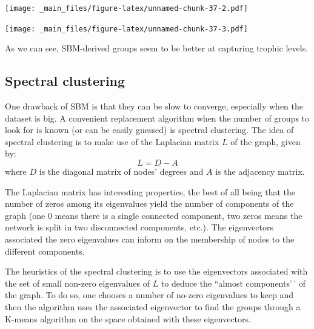 \documentclass[
]{book}
\newenvironment{Shaded}{\begin{snugshade}}{\end{snugshade}}
\newcommand{\AttributeTok}[1]{\textcolor[rgb]{0.13,0.29,0.53}{#1}}
\newcommand{\DecValTok}[1]{\textcolor[rgb]{0.00,0.00,0.81}{#1}}
\newcommand{\FloatTok}[1]{\textcolor[rgb]{0.00,0.00,0.81}{#1}}
\newcommand{\FunctionTok}[1]{\textcolor[rgb]{0.13,0.29,0.53}{\textbf{#1}}}
\newcommand{\NormalTok}[1]{#1}
\newcommand{\SpecialCharTok}[1]{\textcolor[rgb]{0.81,0.36,0.00}{\textbf{#1}}}
\newcommand{\StringTok}[1]{\textcolor[rgb]{0.31,0.60,0.02}{#1}}
\theoremstyle{definition}
\theoremstyle{definition}
\theoremstyle{definition}
\theoremstyle{definition}
\theoremstyle{remark}
\begin{document}
\texttt{[image: \_main\_files/figure-latex/unnamed-chunk-37-2.pdf]}

\begin{Shaded}
\end{Shaded}

\texttt{[image: \_main\_files/figure-latex/unnamed-chunk-37-3.pdf]}

As we can see, SBM-derived groups seem to be better at capturing trophic levels.

\subsection{Spectral clustering}\label{spectral-clustering}

One drawback of SBM is that they can be slow to converge, especially when the dataset is big. A convenient replacement algorithm when the number of groups to look for is known (or can be easily guessed) is spectral clustering.
The idea of spectral clustering is to make use of the Laplacian matrix \(L\) of the graph, given by:
\[L = D - A\]
where \(D\) is the diagonal matrix of nodes' degrees and \(A\) is the adjacency matrix.

The Laplacian matrix has interesting properties, the best of all being that the number of zeros among its eigenvalues yield the number of components of the graph (one 0 means there is a single connected component, two zeros means the network is split in two disconnected components, etc.). The eigenvectors associated the zero eigenvalues can inform on the membership of nodes to the different components.

The heuristics of the spectral clustering is to use the eigenvectors associated with the set of small non-zero eigenvalues of \(L\) to deduce the ``almost components'\,' of the graph. To do so, one chooses a number of no-zero eigenvalues to keep and then the algorithm uses the associated eigenvector to find the groups through a K-means algorithm on the space obtained with these eigenvectors.
\end{document}

